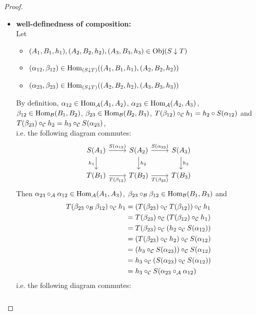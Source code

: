 \documentclass{book}
\begin{document}
	\begin{proof}\
		\begin{itemize}
			\item \textbf{well-definedness of composition:} \\
			Let 
			\begin{itemize}
				\item $(A_1, B_1, h_1), (A_2, B_2, h_2), (A_3, B_3, h_3) \in \operatorname{Obj}(S \downarrow T)$
				\item $(\alpha_{12}, \beta_{12}) \in \operatorname{Hom}_{(S \downarrow T)}((A_1, B_1, h_1), (A_2, B_2, h_2))$ 
				\item $(\alpha_{23}, \beta_{23}) \in \operatorname{Hom}_{(S \downarrow T)}((A_2, B_2, h_2), (A_3, B_3, h_3))$
			\end{itemize}
			By definition, $\alpha_{12} \in \operatorname{Hom}_{\mathcal{A}}(A_1, A_2)$, $\alpha_{23} \in \operatorname{Hom}_{\mathcal{A}}(A_2, A_3)$, $\beta_{12} \in \operatorname{Hom}_{\mathcal{B}}(B_1, B_2)$, $\beta_{23} \in \operatorname{Hom}_{\mathcal{B}}(B_2, B_3)$, $T(\beta_{12}) \circ_{\mathcal{C}} h_1 = h_2 \circ S(\alpha_{12})$ and $T(\beta_{23}) \circ_{\mathcal{C}} h_2 = h_3 \circ_{\mathcal{C}} S(\alpha_{23})$, \\
			i.e. the following diagram commutes:
			\[ 
			\begin{tikzcd}
				S(A_1) \arrow[r, "S(\al_{12})"] \arrow[d, "h_1"'] & S(A_2)  \arrow[d, "h_2"] \arrow[r, "S(\al_{23})"] 
				& S(A_3) \arrow[d, "h_3"]\\
				T(B_1) \arrow[r, "T(\be_{12})"']                  & T(B_2)                   \arrow[r, "T(\be_{23})"'] 
				& T(B_3) 
			\end{tikzcd}
			\]
			Then $\alpha_{23} \circ_{\mathcal{A}} \alpha_{12} \in \operatorname{Hom}_{\mathcal{A}}(A_1, A_3)$, $\beta_{23} \circ_{\mathcal{B}} \beta_{12} \in \operatorname{Hom}_{\mathcal{B}}(B_1, B_3)$ and 
			\begin{align*}
				T(\beta_{23} \circ_{\mathcal{B}} \beta_{12}) \circ_{\mathcal{C}} h_1
				& = (T(\beta_{23}) \circ_{\mathcal{C}} T(\beta_{12})) \circ_{\mathcal{C}} h_1 \\
				& = T(\beta_{23}) \circ_{\mathcal{C}} (T(\beta_{12}) \circ_{\mathcal{C}} h_1) \\
				& = T(\beta_{23}) \circ_{\mathcal{C}} (h_2 \circ_{\mathcal{C}} S(\alpha_{12})) \\
				& = (T(\beta_{23}) \circ_{\mathcal{C}} h_2) \circ_{\mathcal{C}} S(\alpha_{12}) \\
				& = (h_3 \circ_{\mathcal{C}} S(\alpha_{23})) \circ_{\mathcal{C}} S(\alpha_{12}) \\
				& = h_3 \circ_{\mathcal{C}} (S(\alpha_{23}) \circ_{\mathcal{C}} S(\alpha_{12})) \\
				& = h_3 \circ_{\mathcal{C}} S(\alpha_{23} \circ_{\mathcal{A}} \alpha_{12})
			\end{align*}
			i.e. the following diagram commutes:
			\[ 
			\begin{tikzcd}

\end{tikzcd}\]
\end{itemize}
\end{proof}
\end{document}
